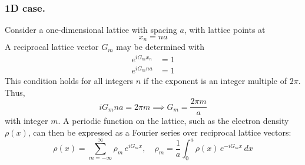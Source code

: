 \documentclass[../../../main.tex]{subfiles}
\begin{document}
\subsubsection{1D case.}
Consider a one-dimensional lattice with spacing $a$, with lattice points at
\begin{equation*}
    x_n = n a
\end{equation*}
A reciprocal lattice vector $G_m$ may be determined with
\begin{align*}
    e^{i G_m x_n} & =  1 \\
    e^{i G_m n a} & =  1
\end{align*}
This condition holds for all integers $n$ if the exponent is an integer multiple of $2\pi$.
Thus,
\begin{equation*}
    i G_m na=2\pi m \implies G_m = \frac{2 \pi m}{a}
\end{equation*}
with integer $m$.
A periodic function on the lattice, such as the electron density $\rho(x)$, can then be expressed as a Fourier series over reciprocal lattice vectors:
\begin{equation*}
    \rho(x) = \sum_{m=-\infty}^{\infty} \rho_m \, e^{i G_m x}, \quad
    \rho_m = \frac{1}{a} \int_0^a \rho(x) \, e^{-i G_m x} \, dx
\end{equation*}
\end{document}
